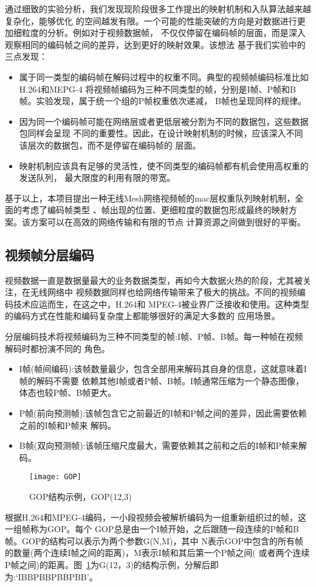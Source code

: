 通过细致的实验分析，我们发现现阶段很多工作提出的映射机制和入队算法越来越复杂化，能够优化
的空间越发有限。一个可能的性能突破的方向是对数据进行更加细粒度的分析。例如对于视频数据帧，
不仅仅停留在编码帧的层面，而是深入观察相同的编码帧之间的差异，达到更好的映射效果。该想法
基于我们实验中的三点发现：
\begin{itemize}
\item[1.] 属于同一类型的编码帧在解码过程中的权重不同。典型的视频帧编码标准比如H.264和MEPG-4
将视频帧编码为三种不同类型的帧，分别是I帧、P帧和B帧。实验发现，属于统一个组的P帧权重依次递减，
B帧也呈现同样的规律。
\item[2.] 因为同一个编码帧可能在网络层或者更低层被分割为不同的数据包，这些数据包同样会呈现
不同的重要性。因此，在设计映射机制的时候，应该深入不同该层次的数据包，而不是停留在编码帧的
层面。
\item[3.] 映射机制应该具有足够的灵活性，使不同类型的编码帧都有机会使用高权重的发送队列，
最大限度的利用有限的带宽。
\end{itemize}

基于以上，本项目提出一种无线Mesh网络视频帧的mac层权重队列映射机制，全面的考虑了编码帧类型
、帧出现的位置、更细粒度的数据包形成最终的映射方案。该方案可以在高效的网络传输和有限的节点
计算资源之间做到很好的平衡。

\subsection{视频帧分层编码}
视频数据一直是数据量最大的业务数据类型，再如今大数据火热的阶段，尤其被关注，在无线网络中
视频数据同样也给网络传输带来了极大的挑战。不同的视频编码技术应运而生，在这之中，H.264和
MPEG-4被业界广泛接收和使用。这种类型的编码方式在性能和编码复杂度上都能够很好的满足大多数的
应用场景。

分层编码技术将视频编码为三种不同类型的帧:I帧、P帧、B帧。每一种帧在视频解码时都扮演不同的
角色。
\begin{itemize}
\item I帧(帧间编码):该帧数量最少，包含全部用来解码其自身的信息，这就意味着I帧的解码不需要
依赖其他I帧或者P帧、B帧。I帧通常压缩为一个静态图像，体态也较P帧、B帧更大。
\item P帧(前向预测帧):该帧包含它之前最近的I帧和P帧之间的差异，因此需要依赖之前的I帧和P帧来
解码。
\item B帧(双向预测帧):该帧压缩尺度最大，需要依赖其之前和之后的I帧和P帧来解码。
\end{itemize}

\begin{figure}[H] %
  \centering
  \texttt{[image: GOP]}
  \caption{GOP结构示例，GOP(12,3)}
  \label{fig:gop}
\end{figure}
根据H.264和MPEG-4编码，一小段视频会被解析编码为一组重新组织过的帧，这一组帧称为GOP。每个
GOP总是由一个I帧开始，之后跟随一段连续的P帧和B帧。GOP的结构可以表示为两个参数G(N,M)，其中
N表示GOP中包含的所有帧的数量(两个连续I帧之间的距离)，M表示I帧和其后第一个P帧之间(
或者两个连续P帧之间)的距离。图~\ref{fig:gop}为G(12，3)的结构示例，分解后即为:‘IBBPBBPBBPBB’。

